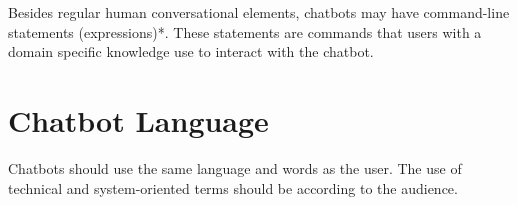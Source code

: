 \documentclass[a4paper,10pt]{article}
\begin{document}
 Besides regular human conversational elements, chatbots may have command-line statements (expressions)*. These statements are commands that users with a domain specific knowledge use to interact with the chatbot.
 
 \section{Chatbot Language}
 
 Chatbots should use the same language and words as the user. The use of technical and system-oriented terms should be according to the audience. 


\medskip


\end{document}
